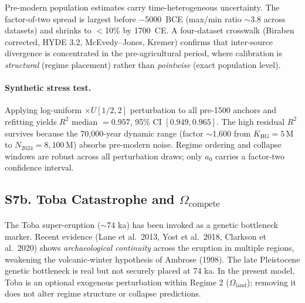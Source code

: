 \documentclass[11pt]{article}
\begin{document}
Pre-modern population estimates carry time-heterogeneous uncertainty.
The factor-of-two spread is largest before $-$5000~BCE (max/min ratio $\sim$3.8 across datasets)
and shrinks to $<$10\% by 1700~CE.
A four-dataset crosswalk (Biraben corrected, HYDE 3.2, McEvedy--Jones, Kremer) confirms that
inter-source divergence is concentrated in the pre-agricultural period, where calibration is
\emph{structural} (regime placement) rather than \emph{pointwise} (exact population level).

\paragraph{Synthetic stress test.}
Applying log-uniform $\times U[1/2,2]$ perturbation to all pre-1500 anchors and refitting
yields $R^2$ median $=0.957$, 95\% CI $[0.949,0.965]$.
The high residual $R^2$ survives because the 70,000-year dynamic range (factor $\sim$1,600 from
$K_{\mathrm{HG}}=5$\,M to $N_{2024}=8{,}100$\,M) absorbs pre-modern noise.
Regime ordering and collapse windows are robust across all perturbation draws;
only $a_0$ carries a factor-two confidence interval.

\subsection*{S7b. Toba Catastrophe and $\Omega_{\mathrm{compete}}$}

The Toba super-eruption ($\sim$74 ka) has been invoked as a genetic bottleneck marker.
Recent evidence (Lane et al.\ 2013, Yost et al.\ 2018, Clarkson et al.\ 2020) shows
\emph{archaeological continuity} across the eruption in multiple regions, weakening the
volcanic-winter hypothesis of Ambrose (1998).
The late Pleistocene genetic bottleneck is real but not securely placed at 74 ka.
In the present model, Toba is an optional exogenous perturbation within Regime 2
($\Omega_{\mathrm{land}}$); removing it does not alter regime structure or collapse predictions.

\end{document}
